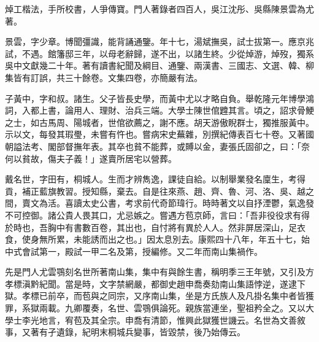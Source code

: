 \begin{pinyinscope}
焯工楷法，手所校書，人爭傳寶。門人著錄者四百人，吳江沈彤、吳縣陳景雲為尤著。

景雲，字少章。博聞彊識，能背誦通鑒。年十七，湯斌撫吳，試士拔第一。應京兆試，不遇。館籓邸三年，以母老辭歸，遂不出，以諸生終。少從焯游，焯歿，獨系吳中文獻幾二十年。著有讀書紀聞及綱目、通鑒、兩漢書、三國志、文選、韓、柳集皆有訂誤，共三十餘卷。文集四卷，亦簡嚴有法。

子黃中，字和叔。諸生。父子皆長史學，而黃中尤以才略自負。舉乾隆元年博學鴻詞，入都上書，論用人、理財、治兵三端。大學士陳世倌韙其言。頃之，詔求骨鯁之士，如古馬周、陽城者，世倌欲薦之，謝不應。胡天游傲睨群士，獨推服黃中。示以文，每發其瑕璺，未嘗有忤也。嘗病宋史蕪雜，別撰紀傳表百七十卷。又著國朝謚法考、閣部督撫年表。其卒也貧不能葬，或賻以金，妻張氏固卻之，曰：「奈何以貧故，傷夫子義！」遂賣所居宅以營葬。

戴名世，字田有，桐城人。生而才辨雋逸，課徒自給。以制舉業發名廩生，考得貢，補正藍旗教習。授知縣，棄去。自是往來燕、趙、齊、魯、河、洛、吳、越之間，賣文為活。喜讀太史公書，考求前代奇節瑋行。時時著文以自抒湮鬱，氣逸發不可控御。諸公貴人畏其口，尤忌嫉之。嘗遇方苞京師，言曰：「吾非役役求有得於時也，吾胸中有書數百卷，其出也，自忖將有異於人人。然非屏居深山，足衣食，使身無所累，未能誘而出之也。」因太息別去。康熙四十八年，年五十七，始中式會試第一，殿試一甲二名及第，授編修。又二年而南山集禍作。

先是門人尤雲鶚刻名世所著南山集，集中有與餘生書，稱明季三王年號，又引及方孝標滇黔紀聞。當是時，文字禁網嚴，都御史趙申喬奏劾南山集語悖逆，遂逮下獄。孝標已前卒，而苞與之同宗，又序南山集，坐是方氏族人及凡掛名集中者皆獲罪，系獄兩載。九卿覆奏，名世、雲鶚俱論死。親族當連坐，聖祖矜全之。又以大學士李光地言，宥苞及其全宗。申喬有清節，惟興此獄獲世譏云。名世為文善敘事，又著有孑遺錄，紀明末桐城兵變事，皆毀禁，後乃始傳云。


\end{pinyinscope}
